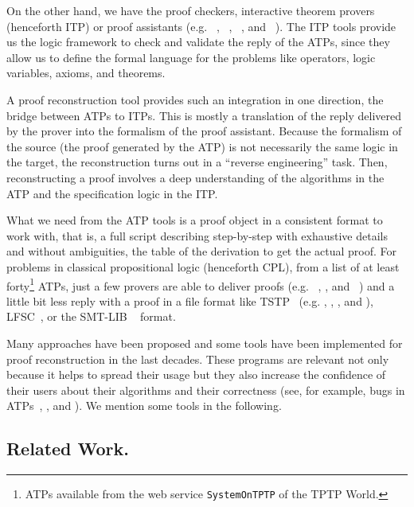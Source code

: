 \documentclass[runningheads,a4paper]{llncs}
\begin{document}
On the other hand, we have the proof checkers, interactive theorem provers
(henceforth ITP) or proof assistants (e.g. ~\cite{agdateam},
~\cite{coqteam}, ~\cite{paulson1994isabelle}, and
~\cite{norrish2007hol}). The ITP tools provide us the logic framework
to check and validate the reply of the ATPs, since they allow us to define the
formal language for the problems like operators, logic variables, axioms, and
theorems.

A proof reconstruction tool provides such an integration in one direction, the
bridge between ATPs to ITPs. This is mostly a translation of the reply delivered
by the prover into the formalism of the proof assistant.
Because the formalism of the source (the proof generated by the ATP) is not
necessarily the same logic in the target, the reconstruction turns out in a
``reverse engineering'' task. Then, reconstructing a proof involves a deep
understanding of the algorithms in the ATP and the specification logic in the ITP.

What we need from the ATP tools is a proof object in a consistent format to work
with, that is, a full script describing step-by-step with exhaustive details and
without ambiguities, the table of the derivation to get the actual proof.
For problems in classical propositional logic (henceforth CPL), from a list of
at least forty\footnote{ATPs available from the web service \texttt{SystemOnTPTP}
of the TPTP World.} ATPs, just a few provers are able to deliver proofs (e.g.
~\cite{Barrett2011}, , and 
~\cite{hillenbrand1997}) and a little bit less reply with a proof in a file
format like TSTP~\cite{sutcliffe2004tstp} (e.g. , ,
, and ), LFSC~\cite{Stump2008}, or the SMT-LIB
~\cite{Bohme2011} format.

Many approaches have been proposed and some tools have been implemented for
proof reconstruction in the last decades. These programs are relevant not only
because it helps to spread their usage but they also increase the confidence of
their users about their algorithms and their correctness (see, for example, bugs
in ATPs~\cite{Keller2013}, \cite{Bohme2011}, and \cite{Fleury2014}).
We mention some tools in the following.

\subsection*{Related Work.}\label{Related Work}
\end{document}
